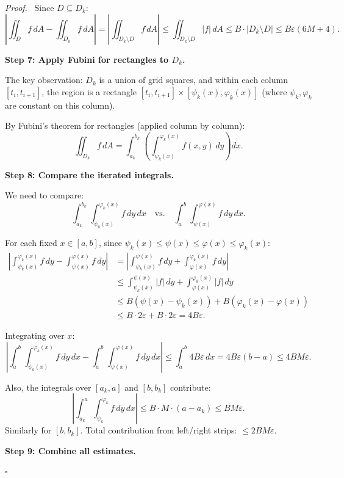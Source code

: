 \documentclass[11pt]{report}
\renewenvironment{proof}[1][Proof]{\par\noindent\textit{#1.}\ }{\hfill$\square$\par\medskip}
\begin{document}
\begin{proof}
Since $D \subseteq D_k$:
\[
\left| \iint_D f \, dA - \iint_{D_k} f \, dA \right| = \left| \iint_{D_k \setminus D} f \, dA \right| \leq \iint_{D_k \setminus D} |f| \, dA \leq B \cdot |D_k \setminus D| \leq B\varepsilon(6M + 4).
\]

\textbf{Step 7: Apply Fubini for rectangles to $D_k$.}

The key observation: $D_k$ is a union of grid squares, and within each column $[t_i, t_{i+1}]$, the region is a rectangle $[t_i, t_{i+1}] \times [\psi_k(x), \varphi_k(x)]$ (where $\psi_k, \varphi_k$ are constant on this column).

By Fubini's theorem for rectangles (applied column by column):
\[
\iint_{D_k} f \, dA = \int_{a_k}^{b_k} \left( \int_{\psi_k(x)}^{\varphi_k(x)} f(x, y) \, dy \right) dx.
\]

\textbf{Step 8: Compare the iterated integrals.}

We need to compare:
\[
\int_{a_k}^{b_k} \int_{\psi_k(x)}^{\varphi_k(x)} f \, dy \, dx \quad \text{vs.} \quad \int_a^b \int_{\psi(x)}^{\varphi(x)} f \, dy \, dx.
\]

For each fixed $x \in [a, b]$, since $\psi_k(x) \leq \psi(x) \leq \varphi(x) \leq \varphi_k(x)$:
\begin{align*}
\left| \int_{\psi_k(x)}^{\varphi_k(x)} f \, dy - \int_{\psi(x)}^{\varphi(x)} f \, dy \right| &= \left| \int_{\psi_k(x)}^{\psi(x)} f \, dy + \int_{\varphi(x)}^{\varphi_k(x)} f \, dy \right| \\
&\leq \int_{\psi_k(x)}^{\psi(x)} |f| \, dy + \int_{\varphi(x)}^{\varphi_k(x)} |f| \, dy \\
&\leq B(\psi(x) - \psi_k(x)) + B(\varphi_k(x) - \varphi(x)) \\
&\leq B \cdot 2\varepsilon + B \cdot 2\varepsilon = 4B\varepsilon.
\end{align*}

Integrating over $x$:
\[
\left| \int_a^b \int_{\psi_k(x)}^{\varphi_k(x)} f \, dy \, dx - \int_a^b \int_{\psi(x)}^{\varphi(x)} f \, dy \, dx \right| \leq \int_a^b 4B\varepsilon \, dx = 4B\varepsilon(b - a) \leq 4BM\varepsilon.
\]

Also, the integrals over $[a_k, a]$ and $[b, b_k]$ contribute:
\[
\left| \int_{a_k}^{a} \int_{\psi_k}^{\varphi_k} f \, dy \, dx \right| \leq B \cdot M \cdot (a - a_k) \leq BM\varepsilon.
\]
Similarly for $[b, b_k]$. Total contribution from left/right strips: $\leq 2BM\varepsilon$.

\textbf{Step 9: Combine all estimates.}


\end{proof}
\end{document}
